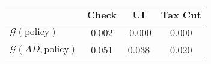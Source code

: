 \begin{tabular}{@{}lccc@{}} 
\toprule 
                          & Check      & UI    & Tax Cut    \\  \midrule 
$\mathcal{G}(\text{policy})$ & 0.002  & -0.000  & 0.000     \\ 
$\mathcal{G}(AD,\text{policy})$ & 0.051  & 0.038  & 0.020     \\ 
\end{tabular}  
